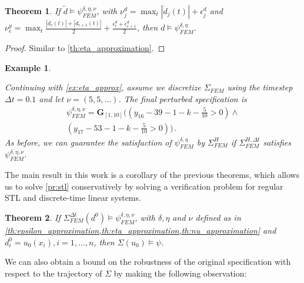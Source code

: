 \documentclass[letterpaper, 10 pt, conference]{ieeeconf/ieeeconf}
\newtheorem{theorem}{Theorem}
\newtheorem{example}{Example}
\newcommand{\Always}{\mathbf{G}}
\begin{document}
\begin{theorem}
    \label{th:nu_approximation}
    If $\tilde d \models \psi^{\delta, \eta, \nu}_{FEM}$, with
    $\nu^d_j = \max_t |\dot d_j(t)| + \epsilon^d_j$ and
    $\nu^y_e = \max_t \frac{|\dot d_e(t)| + |\dot d_{e+1}(t)|}{2} +
    \frac{\epsilon^d_e + \epsilon^d_{e+1}}{2}$, then 
    $d \models \psi^{\delta, \eta}_{FEM}$.
\end{theorem}
\begin{proof}
    Similar to \cref{th:eta_approximation}.
\end{proof}

\begin{example}
    \label{ex:nu_approx}

    Continuing with \cref{ex:eta_approx}, assume we discretize $\Sigma_{FEM}$ using
    the timestep $\Delta t = 0.1$ and let $\nu = (5, 5, ...)$. The final
    perturbed specification is
    \begin{multline}
        \psi^{\delta, \eta, \nu}_{FEM} = \Always_{[1,10]} \bigl(
            (y_{16} - 39 - 1 - k - \frac{5}{10} > 0) \land \\ 
            (y_{17} - 53 - 1 - k - \frac{5}{10} > 0)
        \bigr) \,.
    \end{multline}
    As before, we can guarantee the satisfaction of $\psi^{\delta,
    \eta}_{FEM}$ by $\Sigma^H_{FEM}$ if $\Sigma_{FEM}^{H, \Delta t}$ satisfies
    $\psi^{\delta, \eta, \nu}_{FEM}$.
    
\end{example}

The main result in this work is a corollary of the previous theorems, which
allows us to solve \cref{pr:stl}
conservatively by solving a verification problem for regular STL and discrete-time
linear systems. 

\begin{theorem}
    If $\Sigma_{FEM}^{\Delta t}(d^0) \models \psi^{\delta, \eta, \nu}_{FEM}$, with $\delta, \eta$
    and $\nu$ defined as in \cref{th:epsilon_approximation,th:eta_approximation,th:nu_approximation}
    and $d^0_i = u_0(x_i), i = 1,...,n$, then $\Sigma(u_0) \models \psi$.
\end{theorem}

We can also obtain a bound on the robustness of the
original specification with respect to the trajectory of $\Sigma$ by making the
following observation:
\end{document}
